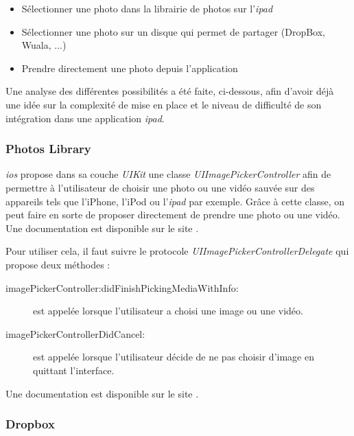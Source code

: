 \medskip

\begin{itemize}
	\item Sélectionner une photo dans la librairie de photos sur l'\emph{\gls{ipad}}
	\item Sélectionner une photo sur un disque qui permet de partager (DropBox, Wuala, ...)
	\item Prendre directement une photo depuis l'application
\end{itemize}

\medskip

Une analyse des différentes possibilités a été faite, ci-dessous, afin d'avoir déjà une idée sur la complexité de mise en place et le niveau de difficulté de son intégration dans une application \emph{\gls{ipad}}.

\subsubsection{Photos Library}
\emph{\gls{ios}} propose dans sa couche \emph{UIKit} une classe \emph{UIImagePickerController} afin de permettre à l'utilisateur de choisir une photo ou une vidéo sauvée sur des appareils tels que l'iPhone, l'iPod ou l'\emph{\gls{ipad}} par exemple. Grâce à cette classe, on peut faire en sorte de proposer directement de prendre une photo ou une vidéo. Une documentation est disponible sur le site \cite{online:iosimagepickercontroller}.

\medskip

Pour utiliser cela, il faut suivre le protocole \emph{UIImagePickerControllerDelegate} qui propose deux méthodes : 

\begin{description}
  \item [imagePickerController:didFinishPickingMediaWithInfo:] est appelée lorsque l'utilisateur a choisi une image ou une vidéo.
  \item [imagePickerControllerDidCancel:] est appelée lorsque l'utilisateur décide de ne pas choisir d'image en quittant l'interface.
\end{description}

\medskip

Une documentation est disponible sur le site \cite{online:iosimagepickerdelegate}.


\subsubsection{Dropbox}

